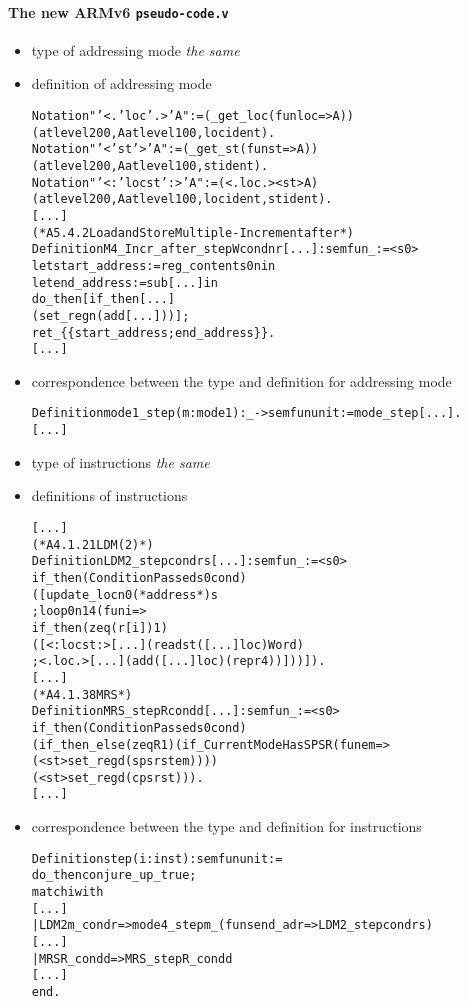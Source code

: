 \documentclass[a4paper, 11pt]{article}
\newenvironment{coq}
  {%
   \begin{alltt}} %% 8.3pl1 (January 2011)
  {\end{alltt} %
  }
\begin{document}
\paragraph{The new ARMv6 {\tt pseudo-code.v}}
  \begin{itemize}
  \item type of addressing mode
\emph{the same}
  \item definition of addressing mode
\begin{coq}
Notation "'<.' loc '.>' A" := (_get_loc (fun loc => A)) 
  (at level 200, A at level 100, loc ident).
Notation "'<' st '>' A" := (_get_st (fun st => A)) 
  (at level 200, A at level 100, st ident).
Notation "'<:' loc st ':>' A" := (<.loc.> <st> A) 
  (at level 200, A at level 100, loc ident, st ident).
[...]
(* A5.4.2 Load and Store Multiple - Increment after *)
Definition M4_Incr_after_step W cond n r [...] : semfun _ := <s0>
  let start_address := reg_content s0 n in
  let end_address := sub [...] in
  do_then [ if_then [...]
       (set_reg n (add [...])) ];
  ret_ \{\{ start_address ; end_address \}\}.
[...]
\end{coq}
  \item correspondence between the type and definition for addressing mode
\begin{coq}
Definition mode1\_step (m : mode1) : _ -> semfun unit := mode\_step [...].
[...]
\end{coq}
  \item type of instructions
\emph{the same}
  \item definitions of instructions
\begin{coq}
[...]
(* A4.1.21 LDM (2) *)
Definition LDM2_step cond r s [...] : semfun _ := <s0>
  if_then (ConditionPassed s0 cond)
    ([ update_loc n0 (*address*) s
    ; loop 0 n14 (fun i => 
         if_then (zeq (r[i]) 1)
           ([ <:loc st:> [...] (read st ([...] loc) Word)
           ; <.loc.> [...] (add ([...] loc) (repr 4)) ])) ]).
[...]
(* A4.1.38 MRS *)
Definition MRS_step R cond d [...] : semfun _ := <s0>
  if_then (ConditionPassed s0 cond)
    (if_then_else (zeq R 1) (if_CurrentModeHasSPSR (fun em =>
      (<st> set_reg d (spsr st em))))
      (<st> set_reg d (cpsr st))).
[...]
\end{coq}
  \item correspondence between the type and definition for instructions
\begin{coq}
Definition step (i : inst) : semfun unit :=
  do_then conjure_up_true;
  match i with
[...]
    | LDM2 m_ cond r => mode4_step m_ (fun s end_adr => LDM2_step cond r s)
[...]
    | MRS R_ cond d => MRS_step R_ cond d
[...]
  end.
\end{coq}
  \end{itemize}
\end{document}
